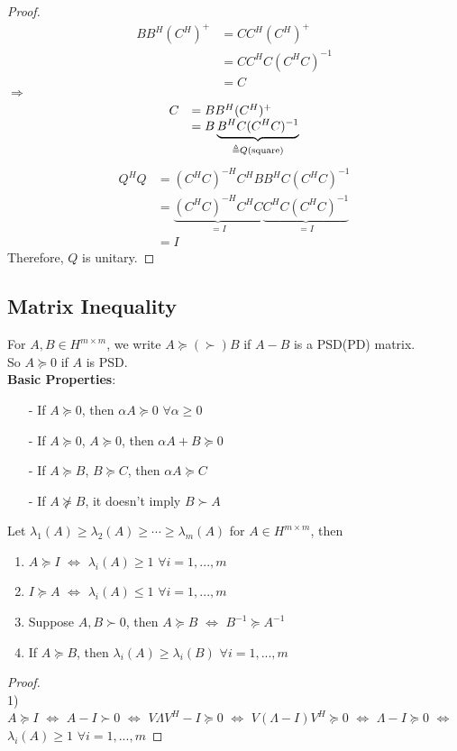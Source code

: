 \begin{multicols}{2}
\begin{proof}
    \[
        \begin{array}{ll}
            BB^H(C^H)^+ &= CC^H(C^H)^{+} \\
            &= CC^HC(C^HC)^{-1} \\
            &= C
        \end{array}
    \]
    $\Longrightarrow$ 
    \[
        \begin{array}{ll}
            C &= BB^H(C^H)^+ \\
            &= B\underbrace{B^HC(C^HC)^{-1}}_{\triangleq Q (\text{\rm square})}
        \end{array}
    \]
    \[
        \begin{array}{ll}
            Q^HQ &= (C^HC)^{-H}C^HBB^HC(C^HC)^{-1} \\
            &= \underbrace{(C^HC)^{-H}C^HC}_{=I}\underbrace{C^HC(C^HC)^{-1}}_{=I} \\
            &= I
        \end{array}
    \]
    Therefore, $Q$ is unitary.
\end{proof}

\subsection{Matrix Inequality}
For $A,B\in H^{m\times m}$, we write $A\succeq (\succ) B$ if $A-B$ is a PSD(PD) matrix.\\
So $A\succeq 0$ if $A$ is PSD.\\
\textbf{Basic Properties}:
\begin{itemize}
    \item [-] If $A \succeq 0$, then $\alpha A \succeq 0$ $\forall \alpha \geq 0$
    \item [-] If $A \succeq 0$, $A\succeq 0$, then $\alpha A+B \succeq 0$
    \item [-] If $A \succeq B$, $B\succeq C$, then $\alpha A \succeq C$
    \item [-] If $A \nsucceq B$, it doesn't imply $B\succ A$
\end{itemize}

Let $\lambda_1(A)\geq \lambda_2(A) \geq \cdots \geq \lambda_m(A)$ for $A\in H^{m\times m}$, then
\begin{enumerate}
    \item $A \succeq I$ $\Longleftrightarrow$ $\lambda_i(A)\geq 1$ $\forall i=1,...,m$
    \item $I \succeq A$ $\Longleftrightarrow$ $\lambda_i(A)\leq 1$ $\forall i=1,...,m$
    \item Suppose $A,B\succ 0$, then $A \succeq B$ $\Longleftrightarrow$ $B^{-1} \succeq A^{-1}$
    \item If $A\succeq B$, then $\lambda_i(A) \geq \lambda_i(B)$ $\forall i=1,...,m$
\end{enumerate}
\begin{proof}\\
    1) \\
    $A\succeq I$ $\Longleftrightarrow$ $A-I\succ 0$ $\Longleftrightarrow$ $V\Lambda V^H -I\succeq 0$ $\Longleftrightarrow$ 
    $V(\Lambda - I) V^H \succeq 0$ $\Longleftrightarrow$ $\Lambda -I \succeq 0$ $\Longleftrightarrow$ $\lambda_i(A)\geq 1$ $\forall i=1,...,m$


\end{proof}
\end{multicols}
